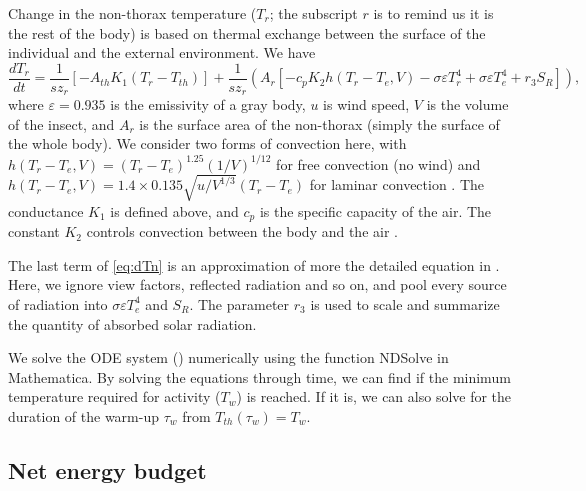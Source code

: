 Change in the  non-thorax temperature ($T_r$; the subscript $r$ is to remind us it is the rest of the body) is based on thermal exchange between the surface of the individual and the external environment.
We have
\begin{equation} \label{eq:dTn}
		\frac{dT_r}{dt} =  \frac{1}{s z_{r}} \left[ - A_{th} K_1(T_r - T_{th})  \right]
			+ \frac{1}{s z_{r}} \left( A_r \left[ - c_p K_2 h(T_r -T_e, V)- \sigma \varepsilon T_r^4 + \sigma \varepsilon T_e^4  + r_3 S_R  \right] \right),
\end{equation}
where $\varepsilon = 0.935$ is the emissivity of a gray body, $u$ is wind speed, $V$ is the volume of the insect, and $A_r$ is the surface area of the non-thorax (simply the surface of the whole body).
We consider two forms of convection here, with $ h(T_r -T_e, V) = (T_r- T_e)^{1.25} (1/V)^{1/12 }$ for free convection (no wind) and $ h(T_r -T_e, V) =  1.4 \times 0.135 \sqrt{u/V^{1/3}} (T_r- T_e) $ for laminar convection \citep{Campbell2012}.
%
The conductance $K_1$ is defined above, and $c_p$ is the specific capacity of the air. %
The constant $K_2$ controls convection between the body and the air \citep{Campbell2012}.

The last term of \cref{eq:dTn}  is an approximation of more the detailed equation in \citet{Campbell2012}.
Here, we ignore view factors, reflected radiation and so on, and pool every source of radiation into $ \sigma \varepsilon T_e^4$ and $S_R$.
The parameter $r_3$ is used to scale and summarize the quantity of absorbed solar radiation.

We solve the ODE system () numerically using the function NDSolve in \nocite{Mathematica10} Mathematica.
By solving the equations through time, we can find if the minimum temperature  required for activity ($T_w$) is reached. %
If it is, we can also solve for the duration of the warm-up $\tau_w$ from $T_{th}(\tau_w) = T_w$.

\subsection*{Net energy budget}

